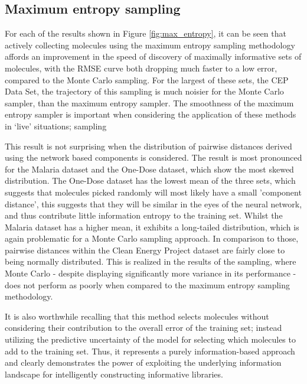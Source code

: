 \subsection{Maximum entropy sampling}

For each of the results shown in Figure \ref{fig:max_entropy}, it can be seen that actively collecting molecules using the maximum entropy sampling methodology affords an improvement in the speed of discovery of maximally informative sets of molecules, with the RMSE curve both dropping much faster to a low error, compared to the Monte Carlo sampling.  For the largest of these sets, the CEP Data Set, the trajectory of this sampling is much noisier for the Monte Carlo sampler, than the maximum entropy sampler.  The smoothness of the maximum entropy sampler is important when considering the application of these methods in `live' situations; sampling 

This result is not surprising when the distribution of pairwise distances derived using the network based components is considered. The result is most pronounced for the Malaria dataset and the One-Dose dataset, which show the most skewed distribution.  The One-Dose dataset has the lowest mean of the three sets, which suggests that molecules picked randomly will most likely have a small 'component distance', this suggests that they will be similar in the eyes of the neural network, and thus contribute little information entropy to the training set. Whilst the Malaria dataset has a higher mean, it exhibits a long-tailed distribution, which is again problematic for a Monte Carlo sampling approach.  In comparison to those, pairwise distances within the Clean Energy Project dataset are fairly close to being normally distributed.  This is realized in the results of the sampling, where Monte Carlo - despite displaying significantly more variance in its performance - does not perform as poorly when compared to the maximum entropy sampling methodology.

It is also worthwhile recalling that this method selects molecules without considering their contribution to the overall error of the training set; instead utilizing the predictive uncertainty of the model for selecting which molecules to add to the training set. Thus, it represents a purely information-based approach and clearly demonstrates the power of exploiting the underlying information landscape for intelligently constructing informative libraries.